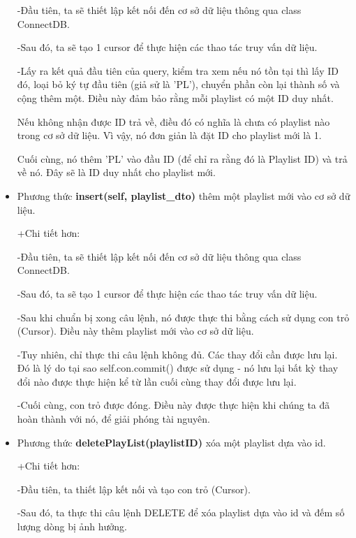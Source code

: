 \documentclass[a4paper]{article}
\begin{document}
\begin{flushleft}
\begin{itemize}
\begin{flushleft}
			      -Đầu tiên, ta sẽ thiết lập kết nối đến cơ sở dữ liệu thông qua class ConnectDB.

			      -Sau đó, ta sẽ tạo 1 cursor để thực hiện các thao tác truy vấn dữ liệu.

			      -Lấy ra kết quả đầu tiên của query, kiểm tra xem nếu nó tồn tại thì
			      lấy ID đó, loại bỏ ký tự đầu tiên (giả sử là 'PL'), chuyển phần còn lại thành số và cộng thêm một.
			      Điều này đảm bảo rằng mỗi playlist có một ID duy nhất.

			      Nếu không nhận được ID trả về, điều đó có nghĩa là chưa có playlist nào trong cơ sở dữ liệu.
			      Vì vậy, nó đơn giản là đặt ID cho playlist mới là 1.

			      Cuối cùng, nó thêm 'PL' vào đầu ID (để chỉ ra rằng đó là Playlist ID) và trả về nó.
			      Đây sẽ là ID duy nhất cho playlist mới.
		      \end{flushleft}
		\item Phương thức \textbf{insert(self, playlist\_dto)} thêm một playlist mới vào cơ sở dữ liệu.
		      \begin{flushleft}
			      +Chi tiết hơn:

			      -Đầu tiên, ta sẽ thiết lập kết nối đến cơ sở dữ liệu thông qua class ConnectDB.

			      -Sau đó, ta sẽ tạo 1 cursor để thực hiện các thao tác truy vấn dữ liệu.

			      -Sau khi chuẩn bị xong câu lệnh, nó được thực thi bằng cách sử dụng con trỏ (Cursor). Điều này thêm playlist mới vào cơ sở dữ liệu.

			      -Tuy nhiên, chỉ thực thi câu lệnh không đủ. Các thay đổi cần được lưu lại. Đó là lý do tại sao self.con.commit() được sử dụng - nó lưu lại bất kỳ thay đổi nào được thực hiện kể từ lần cuối cùng thay đổi được lưu lại.

			      -Cuối cùng, con trỏ được đóng. Điều này được thực hiện khi chúng ta đã hoàn thành với nó, để giải phóng tài nguyên.
		      \end{flushleft}
		\item Phương thức \textbf{deletePlayList(playlistID)} xóa một playlist dựa vào id.
		      \begin{flushleft}
			      +Chi tiết hơn:

			      -Đầu tiên, ta thiết lập kết nối và tạo con trỏ (Cursor).

			      -Sau đó, ta thực thi câu lệnh DELETE để xóa playlist dựa vào id và đếm số lượng dòng bị ảnh hưởng.


\end{flushleft}
\end{itemize}
\end{flushleft}
\end{document}
